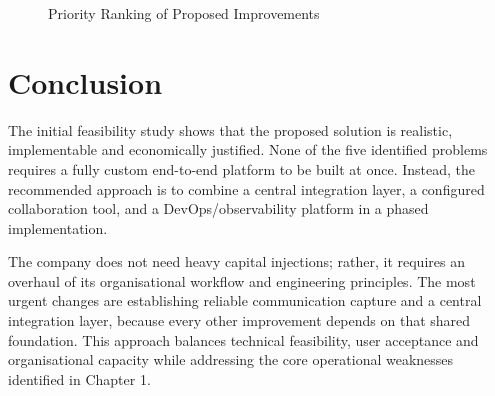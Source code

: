 \documentclass[12pt,a4paper]{report}
\begin{document}
\begin{figure}[H]
\centering
{}
\caption{Priority Ranking of Proposed Improvements}
\end{figure}

\section{Conclusion}
The initial feasibility study shows that the proposed solution is realistic, implementable and economically justified. None of the five identified problems requires a fully custom end-to-end platform to be built at once. Instead, the recommended approach is to combine a central integration layer, a configured collaboration tool, and a DevOps/observability platform in a phased implementation.

The company does not need heavy capital injections; rather, it requires an overhaul of its organisational workflow and engineering principles. The most urgent changes are establishing reliable communication capture and a central integration layer, because every other improvement depends on that shared foundation. This approach balances technical feasibility, user acceptance and organisational capacity while addressing the core operational weaknesses identified in Chapter 1.



\end{document}
